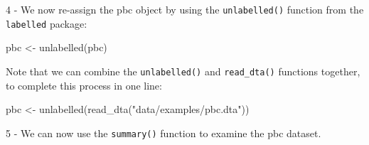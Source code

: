 \documentclass[
]{memoir}
\newenvironment{Shaded}{\begin{snugshade}}{\end{snugshade}}
\newcommand{\FunctionTok}[1]{\textcolor[rgb]{0.00,0.00,0.00}{#1}}
\newcommand{\NormalTok}[1]{#1}
\newcommand{\OtherTok}[1]{\textcolor[rgb]{0.56,0.35,0.01}{#1}}
\newcommand{\StringTok}[1]{\textcolor[rgb]{0.31,0.60,0.02}{#1}}
\begin{document}
4 - We now re-assign the pbc object by using the \texttt{unlabelled()} function from the \texttt{labelled} package:

\begin{Shaded}
\begin{Highlighting}[]
\NormalTok{pbc }\OtherTok{\textless{}{-}} \FunctionTok{unlabelled}\NormalTok{(pbc)}
\end{Highlighting}
\end{Shaded}

Note that we can combine the \texttt{unlabelled()} and \texttt{read\_dta()} functions together, to complete this process in one line:

\begin{Shaded}
\begin{Highlighting}[]
\NormalTok{pbc }\OtherTok{\textless{}{-}} \FunctionTok{unlabelled}\NormalTok{(}\FunctionTok{read\_dta}\NormalTok{(}\StringTok{"data/examples/pbc.dta"}\NormalTok{))}
\end{Highlighting}
\end{Shaded}

5 - We can now use the \texttt{summary()} function to examine the pbc dataset.
\end{document}
